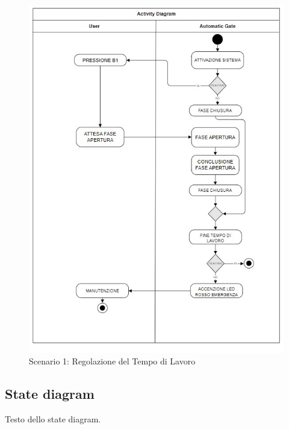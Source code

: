 \documentclass[12pt]{article}
\begin{document}
\begin{figure}[h]
    \centering
    \includegraphics[width = 0.7 \textwidth]{Scenario_4.jpg}
    \caption{Scenario 1: Regolazione del Tempo di Lavoro}
    
\end{figure}
\subsection{State diagram}
Testo dello state diagram.

\newpage
{}
\listoffigures
\end{document}
